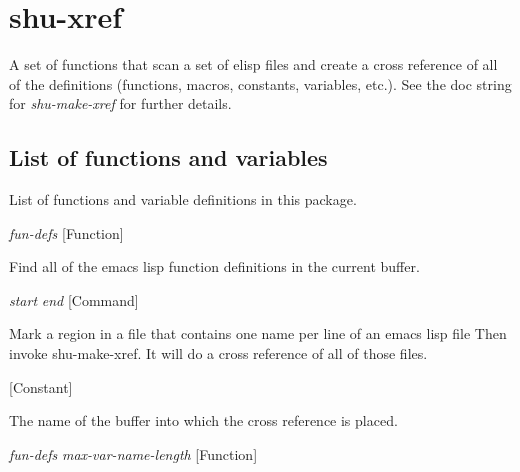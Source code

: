 \eject
\section{shu-xref}



A set of functions that scan a set of elisp files and create a cross reference
of all of the definitions (functions, macros, constants, variables, etc.).
See the doc string for \emph{shu-make-xref} for further details.


\subsection{List of functions and variables}

List of functions and variable definitions in this package.



\vspace{1em}
\noindent
{}
\usebox{\funcname}\emph{fun-defs}
 \hfill [Function]

\begin{doc-string}
Find all of the emacs lisp function definitions in the current buffer.
\end{doc-string}

\vspace{1em}
\noindent
{}
\usebox{\funcname}\emph{start} \emph{end}
 \hfill [Command]

\begin{doc-string}
Mark a region in a file that contains one name per line of an emacs lisp file
Then invoke shu-make-xref.  It will do a cross reference of all of those files.
\end{doc-string}

\vspace{1em}
\noindent
{}
\usebox{\funcname}
 \hfill [Constant]

\begin{doc-string}
The name of the buffer into which the cross reference is placed.
\end{doc-string}

\vspace{1em}
\noindent
{}
\usebox{\funcname}\emph{fun-defs} \emph{max-var-name-length}
 \hfill [Function]
\hspace*{\wd\funcname}


